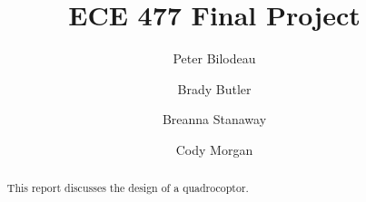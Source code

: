 \documentclass[12pt]{article}
\author{Peter Bilodeau \and
	Brady Butler \and
	Breanna Stanaway\and
	Cody Morgan\\
	}
\title{ECE 477 Final Project}
\begin{document}
\maketitle

\begin{abstract}

This report discusses the design of a quadrocoptor. 

\end{abstract}
\clearpage

\clearpage

\tableofcontents

\clearpage




\clearpage


\clearpage


\clearpage


\clearpage


\clearpage


\clearpage


\clearpage


\clearpage


\clearpage


\clearpage


\clearpage


\clearpage


\clearpage


\clearpage


\clearpage


\clearpage

\clearpage


%

\end{document}
